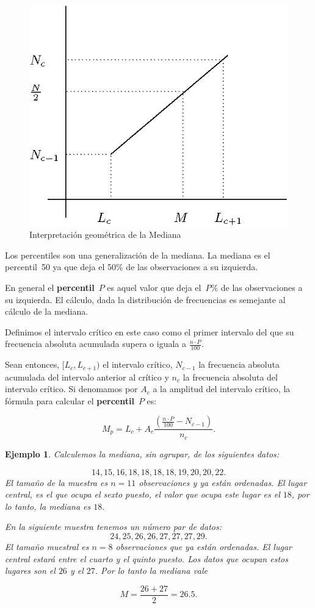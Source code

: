 \documentclass[12pt]{report}
\newtheorem{example}[definition]{Ejemplo}
\begin{document}
\begin{figure}
\begin{center}
\includegraphics{interpretacion.eps}
\end{center}
\caption{Interpretación geométrica de la Mediana} \label{MEDIANA}
\end{figure}

Los percentiles son una generalización de la mediana. La mediana es el percentil~50 ya
que deja el 50\% de las observaciones a su izquierda.

En general el \textbf{percentil}~$P$ es aquel valor que deja el~$P\%$ de las
observaciones a su izquierda. El cálculo, dada la distribución de frecuencias es
semejante al cálculo de la mediana.

Definimos el  intervalo crítico  en  este caso  como el primer intervalo del que su
frecuencia absoluta acumulada supera o iguala a $\frac{n\cdot P}{100}$.


Sean entonces, $[L_c, L_{c+1})$ el intervalo crítico,  $N_{c-1}$ la frecuencia absoluta
acumulada del intervalo anterior al crítico y  $n_c$ la
 frecuencia absoluta del intervalo
crítico. Si denomamos por  $A_c$ a la amplitud  del intervalo crítico, la fórmula
 para calcular el  \textbf{percentil}~$P$ es:

$$M_p =L_c + A_c \frac{\left(\frac{n\cdot P}{100}-N_{c-1}\right)}{n_c}.$$

\begin{example}
Calculemos la mediana, sin agrupar,  de los siguientes datos:

$$
14, 15, 16, 18, 18, 18, 18, 19, 20, 20, 22.
$$
El tama\~{n}o de la muestra es $n=11$ observaciones y ya están ordenadas. El lugar central,
es el que ocupa  el sexto puesto, el valor que ocupa este lugar es el $18$, por lo tanto,
la mediana es $18$.

En la siguiente muestra tenemos un número par de datos:
$$
24, 25, 26, 26, 27, 27, 27, 29.
$$
El tama\~{n}o muestral es $n=8$ observaciones que ya están ordenadas. El lugar central estará
entre el  cuarto y el quinto puesto. Los datos que ocupan estos lugares son el $26$ y el
$27$. Por lo tanto la mediana vale

$$M=\frac{26+27}{2}=26.5.$$
\end{example}
\end{document}
